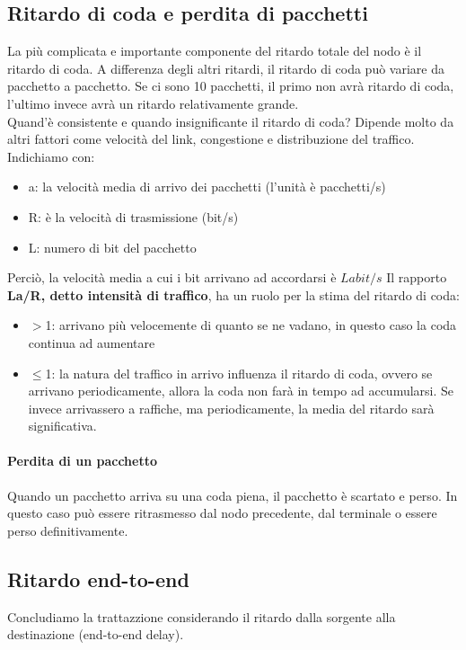 \documentclass[11pt,a4paper]{book}
\begin{document}
\subsection{Ritardo di coda e perdita di pacchetti}
La più complicata e importante componente del ritardo totale del nodo è il ritardo di coda. A differenza degli altri ritardi, il ritardo di coda può variare da pacchetto a pacchetto. Se ci sono 10 pacchetti, il primo non avrà ritardo di coda, l'ultimo invece avrà un ritardo relativamente grande. \\
Quand'è consistente e quando insignificante il ritardo di coda? Dipende molto da altri fattori come velocità del link, congestione e distribuzione del traffico.
Indichiamo con:
\begin{itemize}
	\item a: la velocità media di arrivo dei pacchetti (l'unità è pacchetti/s)
	\item R: è la velocità di trasmissione (bit/s)
	\item L: numero di bit del pacchetto
\end{itemize}	
Perciò, la velocità media a cui i bit arrivano ad accordarsi è $La bit/s$
Il rapporto \textbf{La/R, detto intensità di traffico}, ha un ruolo per la stima del ritardo di coda:
\begin{itemize}
	\item $>$1: arrivano più velocemente di quanto se ne vadano, in questo caso la coda continua ad aumentare
	\item $\leq$1: la natura del traffico in arrivo influenza il ritardo di coda, ovvero se arrivano 	periodicamente, allora la coda non farà in tempo ad accumularsi. Se invece arrivassero a raffiche, ma periodicamente, la media del ritardo sarà significativa.
\end{itemize}
\paragraph{Perdita di un pacchetto}
Quando un pacchetto arriva su una coda piena, il pacchetto è scartato e perso. In questo caso può essere ritrasmesso dal nodo precedente, dal terminale o essere perso definitivamente.

\subsection{Ritardo end-to-end}
Concludiamo la trattazzione considerando il ritardo dalla sorgente alla destinazione (end-to-end delay).
\end{document}
